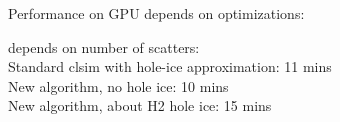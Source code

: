 
\begin{frame}[fragile]{Performance on GPU}
   depends on optimizations: \\


  \bigskip

   depends on number of scatters: \\

  Standard clsim with hole-ice approximation: 11 mins \\
  New algorithm, no hole ice: 10 mins \\
  New algorithm, about H2 hole ice: 15 mins %


\end{frame}